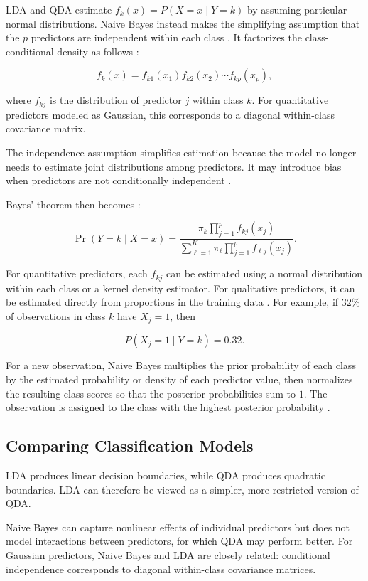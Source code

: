 \documentclass[11pt,letterpaper,reqno]{amsart}
\numberwithin{equation}{subsection}
\theoremstyle{definition}
\numberwithin{thm}{subsection}
\begin{document}
LDA and QDA estimate $f_k(x)=P(X=x\mid Y=k)$ by assuming particular normal distributions. Naive Bayes instead makes the simplifying assumption that the $p$ predictors are independent within each class \cite[Section 4.4.4, p. 158]{James:2023}. It factorizes the class-conditional density as follows \cite[Equation 4.29, p. 159]{James:2023}:

\[
f_k(x)
=
f_{k1}(x_1)
f_{k2}(x_2)
\cdots
f_{kp}(x_p),
\]

where $f_{kj}$ is the distribution of predictor $j$ within class $k$. For quantitative predictors modeled as Gaussian, this corresponds to a diagonal within-class covariance matrix.

The independence assumption simplifies estimation because the model no longer needs to estimate joint distributions among predictors. It may introduce bias when predictors are not conditionally independent \cite[Section 4.4.4, pp. 158--160]{James:2023}.

Bayes' theorem then becomes \cite[Equation 4.30, p. 160]{James:2023}:

\[
\Pr(Y=k\mid X=x)
=
\frac{
\pi_k\prod_{j=1}^{p}f_{kj}(x_j)
}{
\sum_{\ell=1}^{K}
\pi_\ell\prod_{j=1}^{p}f_{\ell j}(x_j)
}.
\]

For quantitative predictors, each $f_{kj}$ can be estimated using a normal distribution within each class or a kernel density estimator. For qualitative predictors, it can be estimated directly from proportions in the training data \cite[Section 4.4.4, pp. 159--160]{James:2023}. For example, if $32\%$ of observations in class $k$ have $X_j=1$, then

\[
P(X_j=1\mid Y=k)=0.32.
\]

For a new observation, Naive Bayes multiplies the prior probability of each class by the estimated probability or density of each predictor value, then normalizes the resulting class scores so that the posterior probabilities sum to $1$. The observation is assigned to the class with the highest posterior probability \cite[Section 4.4.4, p. 160]{James:2023}.

\subsection{Comparing Classification Models}

LDA produces linear decision boundaries, while QDA produces quadratic boundaries. LDA can therefore be viewed as a simpler, more restricted version of QDA.

Naive Bayes can capture nonlinear effects of individual predictors but does not model interactions between predictors, for which QDA may perform better. For Gaussian predictors, Naive Bayes and LDA are closely related: conditional independence corresponds to diagonal within-class covariance matrices.
\end{document}
